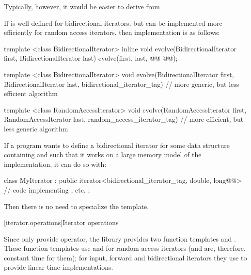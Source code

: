Typically, however, it would be easier to derive
from
.
\exitexample

\pnum
\enterexample
If
is well defined for bidirectional iterators, but can be implemented more
efficiently for random access iterators, then  implementation is as
follows:

\begin{codeblock}
template <class BidirectionalIterator>
inline void
evolve(BidirectionalIterator first, BidirectionalIterator last) {
  evolve(first, last,
    @@
    @@);
}

template <class BidirectionalIterator>
void evolve(BidirectionalIterator first, BidirectionalIterator last,
  bidirectional_iterator_tag) {
  // more generic, but less efficient algorithm
}

template <class RandomAccessIterator>
void evolve(RandomAccessIterator first, RandomAccessIterator last,
  random_access_iterator_tag) {
  // more efficient, but less generic algorithm
}
\end{codeblock}
\exitexample

\pnum
\enterexample
If a \Cpp program wants to define a bidirectional iterator for some data structure containing
and such that it
works on a large memory model of the implementation, it can do so with:

\begin{codeblock}
class MyIterator :
  public iterator<bidirectional_iterator_tag, double, long@@> {
  // code implementing \tcode{++}, etc.
};
\end{codeblock}

\pnum
Then there is no need to specialize the
\added{, }
  template.
\exitexample

[iterator.operations]{Iterator operations}

\pnum
Since only  provide \tcode{+}  \tcode{-}
operator, the library provides two function templates
and
.
These
function templates
use
\tcode{+}
and
\tcode{-}
for random access iterators (and are, therefore, constant
time for them); for input, forward and bidirectional iterators they use
\tcode{++}
to provide linear time
implementations.

